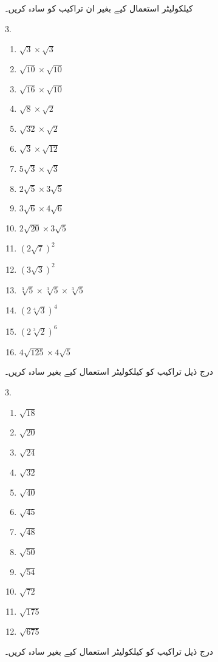 کیلکولیٹر استعمال کیے بغیر ان تراکیب کو سادہ کریں۔
\begin{multicols}{3.}
\begin{enumerate}
\item
\(\sqrt{3}\times\sqrt{3}\)
\item
\(\sqrt{10}\times\sqrt{10}\)
\item
\(\sqrt{16}\times\sqrt{10}\)
\item
\(\sqrt{8}\times\sqrt{2}\)
\item
\(\sqrt{32}\times\sqrt{2}\)
\item
\(\sqrt{3}\times\sqrt{12}\)
\item
\(5\sqrt{3}\times\sqrt{3}\)
\item
\(2\sqrt{5}\times 3\sqrt{5}\)
\item
\(3\sqrt{6}\times 4\sqrt{6}\)
\item
\(2\sqrt{20}\times 3\sqrt{5}\)
\item
\((2\sqrt{7})^{2}\)
\item
\((3\sqrt{3})^{2}\)
\item
\(\sqrt[3]{5}\times\sqrt[3]{5}\times\sqrt[3]{5}\)
\item
\((2\sqrt[4]{3})^4\)
\item
\((2\sqrt[3]{2})^{6}\)
\item
\(4\sqrt{125}\times4\sqrt{5}\)
\end{enumerate}
\end{multicols}
درج ذیل تراکیب کو کیلکولیٹر استعمال کیے بغیر سادہ کریں۔
\begin{multicols}{3.}
\begin{enumerate}
\item
\(\sqrt{18}\)
\item
\(\sqrt{20}\)
\item
\(\sqrt{24}\)
\item
\(\sqrt{32}\)
\item
\(\sqrt{40}\)
\item
\(\sqrt{45}\)
\item
\(\sqrt{48}\)
\item
\(\sqrt{50}\)
\item
\(\sqrt{54}\)
\item
\(\sqrt{72}\)
\item
\(\sqrt{175}\)
\item
\(\sqrt{675}\)
\end{enumerate}
\end{multicols}
درج ذیل تراکیب کو کیلکولیٹر استعمال کیے بغیر سادہ کریں۔

